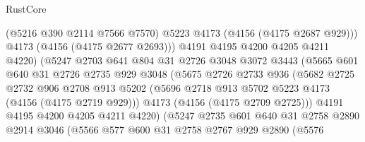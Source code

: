 \begin{lexlean}{RustCore}
\begin{coremodule}
                                (@5216 @390 @2114 @7566 @7570)
                                @5223
                                @4173
                                (@4156 (@4175 @2687 @929)))
                              @4173
                              (@4156 (@4175 @2677 @2693)))
                            @4191
                            @4195
                            @4200
                            @4205
                            @4211
                            @4220)
                          (@5247
                            @2703
                            @641
                            @804
                            @31
                            @2726
                            @3048
                            @3072
                            @3443
                            (@5665
                              @601
                              @640
                              @31
                              @2726
                              @2735
                              @929
                              @3048
                              (@5675
                                @2726
                                @2733
                                @936
                                (@5682
                                  @2725
                                  @2732
                                  @906
                                  @2708
                                  @913
                                  @5202
                                  (@5696 @2718 @913 @5702 @5223 @4173 (@4156 (@4175 @2719 @929)))
                                  @4173
                                  (@4156 (@4175 @2709 @2725)))
                                @4191
                                @4195
                                @4200
                                @4205
                                @4211
                                @4220)
                              (@5247
                                @2735
                                @601
                                @640
                                @31
                                @2758
                                @2890
                                @2914
                                @3046
                                (@5566
                                  @577
                                  @600
                                  @31
                                  @2758
                                  @2767
                                  @929
                                  @2890
                                  (@5576

\end{coremodule}
\end{lexlean}
